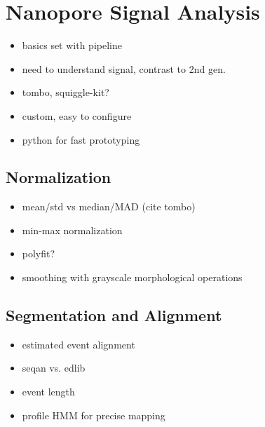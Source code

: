 \chapter{Nanopore Signal Analysis}
\label{sec:signal}

\begin{itemize}
	\item basics set with pipeline
	\item need to understand signal, contrast to 2nd gen.
	\item tombo, squiggle-kit?
	\item custom, easy to configure
	\item python for fast prototyping
\end{itemize}

\section{Normalization}
\label{sec:signal:normalization}

\begin{itemize}
	\item mean/std vs median/MAD (cite tombo)
	\item min-max normalization
	\item polyfit?
	\item smoothing with grayscale morphological operations
\end{itemize}

\section{Segmentation and Alignment}
\label{sec:signal:alignment}

\begin{itemize}
	\item estimated event alignment
	\item seqan vs. edlib
	\item event length
	\item profile HMM for precise mapping
\end{itemize}